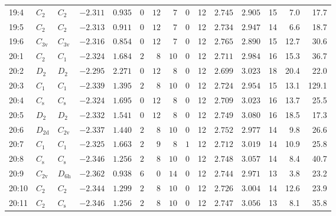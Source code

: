 \begin{table}[htbp]
{\begin{tabular}{lllrrrrrrrrrrrr}
19:4    & $C_\mathrm{2}$  & $C_\mathrm{2 }$ & $-2.311$ & $0.935$  & $0$ & $12$ & $7$      & $0$ & 12  & $2.745$ & $2.905$ & 15  & 7.0  & 17.7  \\
19:5    & $C_\mathrm{2}$  & $C_\mathrm{2 }$ & $-2.313$ & $0.911$  & $0$ & $12$ & $7$      & $0$ & 12  & $2.734$ & $2.947$ & 14  & 6.6  & 18.7  \\
19:6    & $C_\mathrm{3v}$ & $C_\mathrm{3v}$ & $-2.316$ & $0.854$  & $0$ & $12$ & $7$      & $0$ & 12  & $2.765$ & $2.890$ & 15  & 12.7 & 30.6  \\
20:1    & $C_\mathrm{2}$  & $C_\mathrm{1 }$ & $-2.324$ & $1.684$  & $2$ & $8$  & $10$     & $0$ & 12  & $2.711$ & $2.984$ & 16  & 15.3 & 36.7  \\
20:2    & $D_\mathrm{2}$  & $D_\mathrm{2 }$ & $-2.295$ & $2.271$  & $0$ & $12$ & $8$      & $0$ & 12  & $2.699$ & $3.023$ & 18  & 20.4 & 22.0  \\
20:3    & $C_\mathrm{1}$  & $C_\mathrm{1 }$ & $-2.339$ & $1.395$  & $2$ & $8$  & $10$     & $0$ & 12  & $2.724$ & $2.954$ & 15  & 13.1 & 129.1 \\
20:4    & $C_\mathrm{s}$  & $C_\mathrm{s }$ & $-2.324$ & $1.695$  & $0$ & $12$ & $8$      & $0$ & 12  & $2.709$ & $3.023$ & 16  & 13.7 & 25.5  \\
20:5    & $D_\mathrm{2}$  & $D_\mathrm{2 }$ & $-2.332$ & $1.541$  & $0$ & $12$ & $8$      & $0$ & 12  & $2.749$ & $3.080$ & 16  & 18.5 & 17.3  \\
20:6    & $D_\mathrm{2d}$ & $C_\mathrm{2v}$ & $-2.337$ & $1.440$  & $2$ & $8$  & $10$     & $0$ & 12  & $2.752$ & $2.977$ & 14  & 9.8  & 26.6  \\
20:7    & $C_\mathrm{1}$  & $C_\mathrm{1 }$ & $-2.325$ & $1.663$  & $2$ & $9$  & $8$      & $1$ & 12  & $2.712$ & $3.019$ & 14  & 10.9 & 25.8  \\
20:8    & $C_\mathrm{s}$  & $C_\mathrm{s }$ & $-2.346$ & $1.256$  & $2$ & $8$  & $10$     & $0$ & 12  & $2.748$ & $3.057$ & 14  & 8.4  & 40.7  \\
20:9    & $C_\mathrm{2v}$ & $D_\mathrm{6h}$ & $-2.362$ & $0.938$  & $6$ & $0$  & $14$     & $0$ & 12  & $2.744$ & $2.971$ & 13  & 3.8  & 23.2  \\
20:10   & $C_\mathrm{2}$  & $C_\mathrm{2 }$ & $-2.344$ & $1.299$  & $2$ & $8$  & $10$     & $0$ & 12  & $2.726$ & $3.004$ & 14  & 12.6 & 23.9  \\
20:11   & $C_\mathrm{2}$  & $C_\mathrm{s }$ & $-2.346$ & $1.256$  & $2$ & $8$  & $10$     & $0$ & 12  & $2.747$ & $3.056$ & 13  & 8.1  & 35.8  \\

\end{tabular}}
\end{table}
